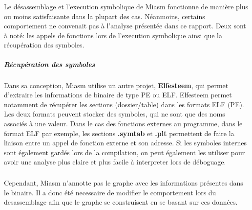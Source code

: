 Le désassemblage et l'execution symbolique de Miasm fonctionne de manière plus ou moins satisfaisante dans la plupart des cas. Néanmoins,
certains comportement ne convenait pas à l'analyse présentée dans ce rapport. Deux sont à noté: les appels de fonctions lors de l'execution symbolique ainsi que
la récupération des symboles.
\subparagraph{Récupération des symboles}
Dans sa conception, Miasm utilise un autre projet, \textbf{Elfesteem}, qui permet d'extraire les informations de binaire de type PE ou ELF. Elfesteem permet notamment
de récupérer les sections (dossier/table) dans les formats ELF (PE). Les deux formats peuvent stocker des symboles, qui ne sont que des noms associés à une valeur.
Dans le cas des fonctions externes au programme, dans le format ELF par exemple, les sections \textbf{.symtab} et \textbf{.plt} permettent de faire la liaison entre un appel de fonction
externe et son adresse. Si les symboles internes sont également gardés lors de la compilation, on peut également les utiliser pour avoir une analyse plus claire et plus facile à interpreter lors
de déboguage.
\subparagraph{}
Cependant, Miasm n'annotte pas le graphe avec les informations présentes dans le binaire. Il a donc été necessaire de modifier le comportement lors du desassemblage afin que le graphe se construisent
en se basant sur ces données.

